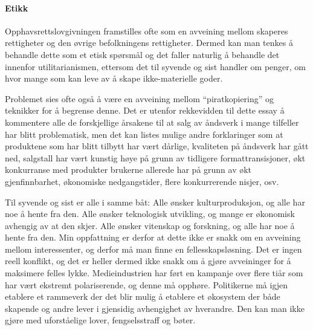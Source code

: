 \documentclass[11pt,norsk,a4paper]{article}
\begin{document}
\paragraph{Etikk}

Opphavsrettslovgivningen framstilles ofte som en avveining mellom
skaperes rettigheter og den øvrige befolkningens rettigheter. Dermed
kan man tenkes å behandle dette som et etisk spørsmål og det faller
naturlig å behandle det innenfor utilitarianismen, ettersom det til
syvende og sist handler om penger, om hvor mange som kan leve av å
skape ikke-materielle goder.

Problemet sies ofte også å være en avveining mellom ``piratkopiering''
og teknikker for å begrense denne. Det er utenfor rekkevidden til
dette essay å kommentere alle de forskjellige årsakene til at
salg av åndsverk i mange tilfeller har blitt problematisk, men det
kan listes mulige andre forklaringer som at produktene som har blitt
tilbytt har vært dårlige, kvaliteten på åndsverk har gått ned,
salgstall har vært kunstig høye på grunn av tidligere
formattransisjoner, økt konkurranse med produkter brukerne allerede
har på grunn av økt gjenfinnbarhet, økonomiske nedgangstider, flere
konkurrerende nisjer, osv. 

Til syvende og sist er alle i samme båt: Alle ønsker kulturproduksjon,
og alle har noe å hente fra den. Alle ønsker teknologisk utvikling, og
mange er økonomisk avhengig av at den skjer. Alle ønsker vitenskap og
forskning, og alle har noe å hente fra den. 
Min oppfattning er derfor at dette ikke er snakk om en avveining
mellom interessenter, og derfor må man finne en
fellesskapsløsning. Det er ingen reell konflikt, og det er heller
dermed ikke snakk om å gjøre avveininger for å maksimere felles
lykke. Medieindustrien har ført en kampanje over flere
tiår som har vært ekstremt polariserende, og denne må
opphøre. Politikerne må igjen etablere et rammeverk der det blir mulig
å etablere et økosystem der både skapende og andre lever i gjensidig
avhengighet av hverandre. Den kan man ikke gjøre med uforståelige
lover, fengselsstraff og bøter. 

{}

\end{document}
